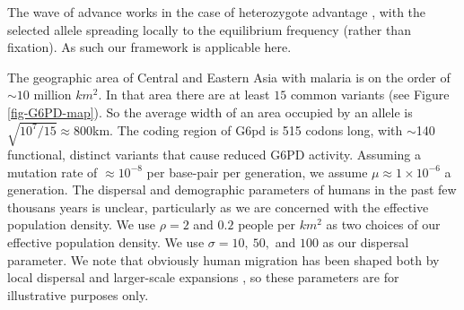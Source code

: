 \documentclass{article}
\begin{document}
The wave of advance works in the case of heterozygote advantage
\citep{aronson1975nonlinear}, with the selected allele spreading
locally to the equilibrium frequency (rather than fixation). As such
our framework is applicable here.





The geographic area of Central and Eastern Asia with malaria is on the
order of $\sim 10$ million $km^2$. In that area there are at least $15$
common variants \citep{Howes-g6pd-variants} (see Figure \ref{fig-G6PD-map}). So the average width of
an area occupied by an allele is $\sqrt{10^7/15} \approx  800$km. 
The coding region of G6pd is 515 codons long, with $\sim$140
functional, distinct variants that cause reduced G6PD activity. Assuming a
mutation rate of $\approx 10^{-8}$ per base-pair per generation, we assume
$\mu \approx 1 \times 10^{-6}$ a generation. 
The dispersal and demographic parameters of humans in the past few
thousans years is unclear,
particularly as we are concerned with the effective population
density. 
We use $\rho=2$ and $0.2$ people per $km^2$ as two choices of our effective population density.
We use $\sigma=10,~50,$ and $100$ as our dispersal parameter. 
We note that obviously human migration has been
shaped both by local dispersal and larger-scale expansions \citep[see
][for a recent discussion]{}, so these parameters are for
illustrative purposes only.
\end{document}
